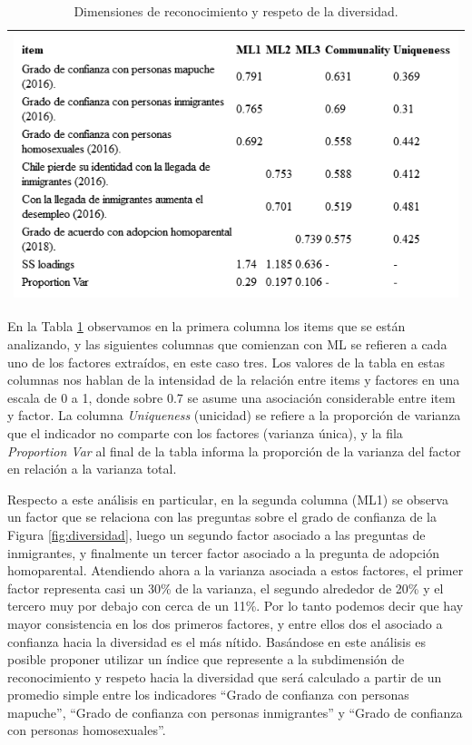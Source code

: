\documentclass[
  12pt,
]{book}
\begin{document}
\begin{longtable}[]{@{}l@{}}
\caption{\label{tab:div-fa}Dimensiones de reconocimiento y respeto de la diversidad.}\tabularnewline
\toprule
\endhead
\includegraphics[width=8.33333in,height=\textheight]{output/tables/div_fa.png}\tabularnewline
\bottomrule
\end{longtable}

En la Tabla \ref{tab:div-fa} observamos en la primera columna los items que se están analizando, y las siguientes columnas que comienzan con ML se refieren a cada uno de los factores extraídos, en este caso tres. Los valores de la tabla en estas columnas nos hablan de la intensidad de la relación entre items y factores en una escala de 0 a 1, donde sobre 0.7 se asume una asociación considerable entre item y factor. La columna \emph{Uniqueness} (unicidad) se refiere a la proporción de varianza que el indicador no comparte con los factores (varianza única), y la fila \emph{Proportion Var} al final de la tabla informa la proporción de la varianza del factor en relación a la varianza total.

Respecto a este análisis en particular, en la segunda columna (ML1) se observa un factor que se relaciona con las preguntas sobre el grado de confianza de la Figura \ref{fig:diversidad}, luego un segundo factor asociado a las preguntas de inmigrantes, y finalmente un tercer factor asociado a la pregunta de adopción homoparental. Atendiendo ahora a la varianza asociada a estos factores, el primer factor representa casi un 30\% de la varianza, el segundo alrededor de 20\% y el tercero muy por debajo con cerca de un 11\%. Por lo tanto podemos decir que hay mayor consistencia en los dos primeros factores, y entre ellos dos el asociado a confianza hacia la diversidad es el más nítido. Basándose en este análisis es posible proponer utilizar un índice que represente a la subdimensión de reconocimiento y respeto hacia la diversidad que será calculado a partir de un promedio simple entre los indicadores ``Grado de confianza con personas mapuche'', ``Grado de confianza con personas inmigrantes'' y ``Grado de confianza con personas homosexuales''.
\end{document}
